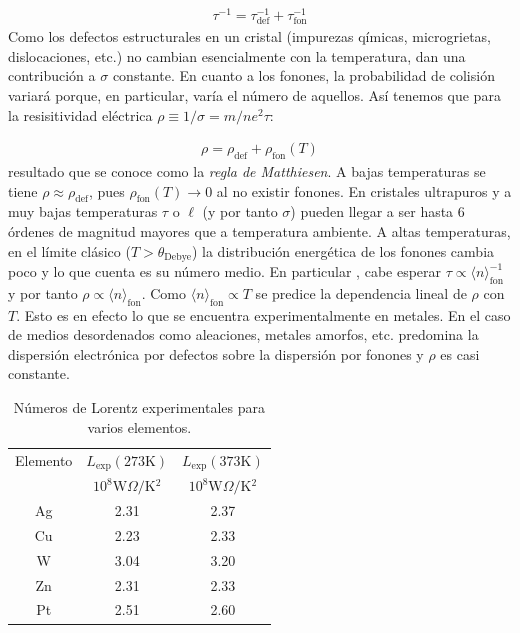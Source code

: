 \begin{eqnarray}
	\tau^{-1} = \tau_{\text{def}}^{-1} +\tau_{\text{fon}}^{-1}
	\label{Ec:06-03-04}
\end{eqnarray}
Como los defectos estructurales en un cristal (impurezas qímicas, microgrietas, dislocaciones, etc.) no cambian esencialmente con la temperatura, dan una contribución a $\sigma$ constante. En cuanto a los fonones, la probabilidad de colisión variará porque, en particular, varía el número de aquellos. Así tenemos que para la resisitividad eléctrica $\rho\equiv 1/\sigma=m/ne^2 \tau$:

\begin{eqnarray}
	\rho = \rho_{\text{def}} + \rho_{\text{fon}} (T)
\end{eqnarray}
resultado que se conoce como la \textit{regla de Matthiesen}. A bajas temperaturas se tiene $\rho\approx \rho_{\text{def}}$, pues $\rho_{\text{fon}}(T)\rightarrow0$ al no existir fonones. En cristales ultrapuros y a muy bajas temperaturas $\tau$ o $\ell$ (y por tanto $\sigma$) pueden llegar a ser hasta 6 órdenes de magnitud mayores que a temperatura ambiente. A altas temperaturas, en el límite clásico ($T>\theta_{\text{Debye}}$) la distribución energética de los fonones cambia poco y lo que cuenta es su número medio. En particular , cabe esperar $\tau \propto \langle n \rangle_{\text{fon}}^{-1}$ y por tanto $\rho \propto \langle n \rangle_\text{fon}$. Como $\langle n \rangle_\text{fon} \propto T$ se predice la dependencia lineal de $\rho$ con $T$. Esto es en efecto lo que se encuentra experimentalmente en metales. En el caso de medios desordenados como aleaciones, metales amorfos, etc. predomina la dispersión electrónica por defectos sobre la dispersión por fonones y $\rho$ es casi constante.

\begin{table}[h!] \centering
	\begin{tabular}{ccc}
		Elemento & $L_{\text{exp}} (\unit{273 \kelvin})$ & $L_{\text{exp}} (\unit{373 \kelvin})$  \\
		& $10^8\unit{\watt \Omega / \kelvin^2}$ &  $10^8\unit{\watt \Omega / \kelvin^2}$ \\ \hline
		Ag & 2.31 & 2.37 \\
		Cu & 2.23 & 2.33 \\
		W  & 3.04 & 3.20 \\
		Zn & 2.31 & 2.33 \\
		Pt & 2.51 & 2.60
	\end{tabular}	
	\caption{Números de Lorentz experimentales para varios elementos.}
	\label{Tab:06-02}
\end{table}


